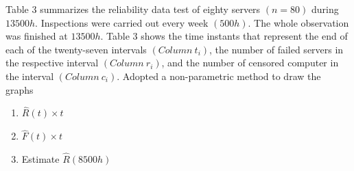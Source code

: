 \documentclass{article}
\begin{document}
\setcounter{Question}{4}
\begin{question}
    Table 3 summarizes the reliability data test of eighty servers $(n = 80)$ during $13500h$. Inspections were carried out every week $(500h)$. The whole observation was finished at $13500h$. Table 3 shows the time instants that represent the end of each of the twenty-seven intervals $(Column \ t_i)$, the number of failed servers in the respective interval $(Column \ r_i)$, and the number of censored computer in the interval $(Column \ c_i)$. Adopted a non-parametric method to draw the graphs
    \begin{enumerate}[label=(\alph*)]
        \item $\hat{R}(t) \times t$
        \item $\hat{F}(t) \times t$
        \item Estimate $\hat{R}(8500h)$
    \end{enumerate}
\end{question}
\end{document}
